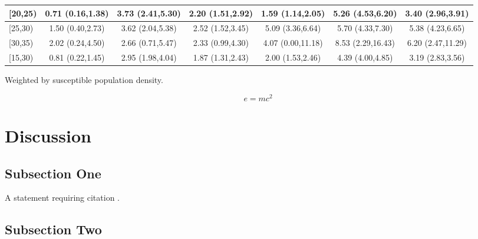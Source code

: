 \documentclass[a4paper,10pt]{article} %
\begin{document}
\begin{table}[!ht]
\begin{adjustwidth}{-20mm}{0mm}
\begin{tabular}{|l|c|c|c|c|c|c|}
[20,25)                               & 0.71 (0.16,1.38)    & 3.73 (2.41,5.30)    & 2.20 (1.51,2.92)    & 1.59 (1.14,2.05)    & 5.26 (4.53,6.20)    & 3.40 (2.96,3.91) \\ \hline
[25,30)                               & 1.50 (0.40,2.73)    & 3.62 (2.04,5.38)    & 2.52 (1.52,3.45)    & 5.09 (3.36,6.64)    & 5.70 (4.33,7.30)    & 5.38 (4.23,6.65) \\ \hline
[30,35)                               & 2.02 (0.24,4.50)    & 2.66 (0.71,5.47)    & 2.33 (0.99,4.30)    & 4.07 (0.00,11.18)   & 8.53 (2.29,16.43)   & 6.20 (2.47,11.29) \\ \hline
[15,30)                               & 0.81 (0.22,1.45)    & 2.95 (1.98,4.04)    & 1.87 (1.31,2.43)    & 2.00 (1.53,2.46)    & 4.39 (4.00,4.85)    & 3.19 (2.83,3.56) \\ \hline
\end{tabular}
\begin{flushleft} Weighted by susceptible population density.
\end{flushleft}
\label{table2}
\end{adjustwidth}
\end{table}

\blindtext %

\begin{equation}
\label{eq:emc}
e = mc^2
\end{equation}

\blindtext %


\section{Discussion}

\subsection{Subsection One}

A statement requiring citation \cite{Schlegel2016}.
\blindtext %

\subsection{Subsection Two}

\blindtext %








\end{document}
